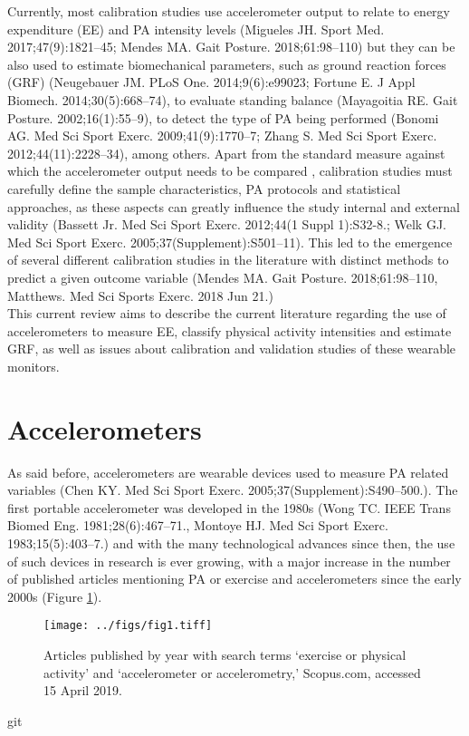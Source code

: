 \documentclass[11pt]{article}
\begin{document}
\noindent
Currently, most calibration studies use accelerometer output to relate to energy expenditure (EE) and PA intensity levels {\tiny (Migueles JH. Sport Med. 2017;47(9):1821–45; Mendes MA. Gait Posture. 2018;61:98–110)} but they can be also used to estimate biomechanical parameters, such as ground reaction forces (GRF) {\tiny (Neugebauer JM. PLoS One. 2014;9(6):e99023; Fortune E. J Appl Biomech. 2014;30(5):668–74)}, to evaluate standing balance	{\tiny (Mayagoitia RE. Gait Posture. 2002;16(1):55–9)}, to detect the type of PA being performed {\tiny (Bonomi AG. Med Sci Sport Exerc. 2009;41(9):1770–7; Zhang S. Med Sci Sport Exerc. 2012;44(11):2228–34)}, among others. Apart from the standard measure against which the accelerometer output needs to be compared	, calibration studies must carefully define the sample characteristics, PA protocols and statistical approaches, as these aspects can greatly influence the study internal and external validity {\tiny (Bassett  Jr. Med Sci Sport Exerc. 2012;44(1 Suppl 1):S32-8.; Welk GJ. Med Sci Sport Exerc. 2005;37(Supplement):S501–11)}. This led to the emergence of several different calibration studies in the literature with distinct methods to predict a given outcome variable {\tiny (Mendes MA. Gait Posture. 2018;61:98–110, Matthews. Med Sci Sports Exerc. 2018 Jun 21.)} 	\\

\noindent
This current review aims to describe the current literature regarding the use of accelerometers to measure EE, classify physical activity intensities and estimate GRF, as well as issues about calibration and validation studies of these wearable monitors.

\section*{Accelerometers}

As said before, accelerometers are wearable devices used to measure PA related variables {\tiny (Chen KY. Med Sci Sport Exerc. 2005;37(Supplement):S490–500.)}. The first portable accelerometer was developed in the 1980s {\tiny (Wong TC. IEEE Trans Biomed Eng. 1981;28(6):467–71., Montoye HJ. Med Sci Sport Exerc. 1983;15(5):403–7.)} and with the many technological advances since then, the use of such devices in research is ever growing, with a major increase in the number of published articles mentioning PA or exercise and accelerometers since the early 2000s (Figure \ref{art_year}).

\begin{figure}[h!]
	\texttt{[image: ../figs/fig1.tiff]}
	\caption{Articles published by year with search terms ‘exercise or physical activity’ and ‘accelerometer or accelerometry,’ Scopus.com, accessed 15 April 2019.}
	\label{art_year}
\end{figure}
git 
\end{document}
